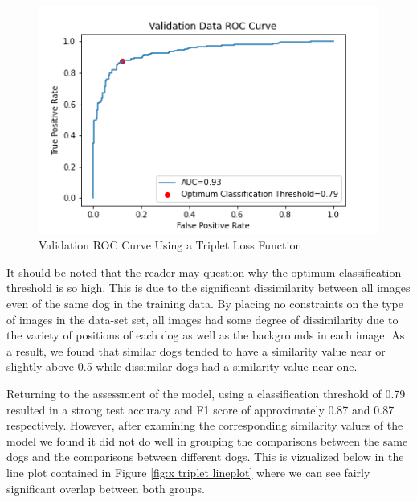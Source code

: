 \documentclass{article}
\begin{document}
\begin{figure}[h]
\centering
	\includegraphics[scale=0.7]{final-report-images/roc_curve_validation_triplet.png}
\caption{Validation ROC Curve Using a Triplet Loss Function}
\label{fig:x val roc curve}
\end{figure}

\noindent It should be noted that the reader may question why the optimum classification threshold is so high.  This is due to the significant dissimilarity between all images even of the same dog in the training data.  By placing no constraints on the type of images in the data-set set, all images had some degree of dissimilarity due to the variety of positions of each dog as well as the backgrounds in each image.  As a result, we found that similar dogs tended to have a similarity value near or slightly above 0.5 while dissimilar dogs had a similarity value near one.  

Returning to the assessment of the model, using a classification threshold of 0.79 resulted in a strong test accuracy and F1 score of approximately 0.87 and 0.87 respectively.  However, after examining the corresponding similarity values of the model we found it did not do well in grouping the comparisons between the same dogs and the comparisons between different dogs.  This is vizualized below in the line plot contained in Figure \ref{fig:x triplet lineplot} where we can see fairly significant overlap between both groups.
\end{document}
